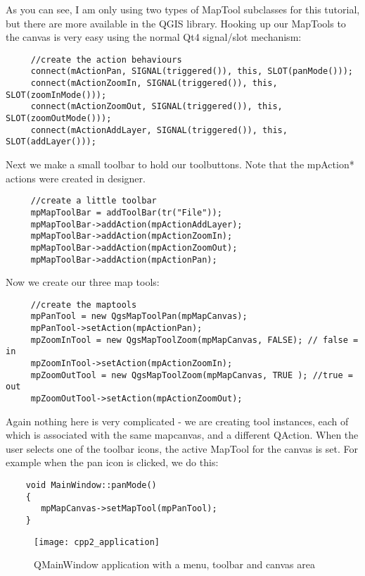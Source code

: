As you can see, I am only using two types of MapTool subclasses for this
tutorial, but there are more available in the QGIS library. Hooking up our
MapTools to the canvas is very easy using the normal Qt4 signal/slot mechanism:

\begin{verbatim}
     //create the action behaviours
     connect(mActionPan, SIGNAL(triggered()), this, SLOT(panMode()));
     connect(mActionZoomIn, SIGNAL(triggered()), this, SLOT(zoomInMode()));
     connect(mActionZoomOut, SIGNAL(triggered()), this, SLOT(zoomOutMode()));
     connect(mActionAddLayer, SIGNAL(triggered()), this, SLOT(addLayer()));
\end{verbatim}

Next we make a small toolbar to hold our toolbuttons. Note that the mpAction*
actions were created in designer.

\begin{verbatim}
     //create a little toolbar
     mpMapToolBar = addToolBar(tr("File"));
     mpMapToolBar->addAction(mpActionAddLayer);
     mpMapToolBar->addAction(mpActionZoomIn);
     mpMapToolBar->addAction(mpActionZoomOut);
     mpMapToolBar->addAction(mpActionPan);
\end{verbatim}

Now we create our three map tools:

\begin{verbatim}
     //create the maptools
     mpPanTool = new QgsMapToolPan(mpMapCanvas);
     mpPanTool->setAction(mpActionPan);
     mpZoomInTool = new QgsMapToolZoom(mpMapCanvas, FALSE); // false = in
     mpZoomInTool->setAction(mpActionZoomIn);
     mpZoomOutTool = new QgsMapToolZoom(mpMapCanvas, TRUE ); //true = out
     mpZoomOutTool->setAction(mpActionZoomOut);
\end{verbatim}

Again nothing here is very complicated - we are creating tool instances, each
of which is associated with the same mapcanvas, and a different QAction. When
the user selects one of the toolbar icons, the active MapTool for the canvas is
set. For example when the pan icon is clicked, we do this:

\begin{verbatim}
    void MainWindow::panMode()
    {
       mpMapCanvas->setMapTool(mpPanTool); 
    }
\end{verbatim}

\begin{figure}[ht]
   \begin{center}
   \caption{QMainWindow application with a menu, toolbar and canvas area
\osxcaption}\label{fig:cpp2_application}\smallskip
   \texttt{[image: cpp2\_application]}
\end{center}
\end{figure}

